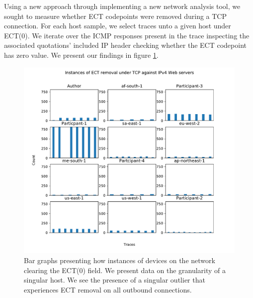 \documentclass{l4proj}
\begin{document}
Using a new approach through implementing a new network analysis tool, we sought to measure whether ECT codepoints were removed during a TCP connection. For each host sample, we select traces unto a given host under ECT(0). We iterate over the ICMP responses present in the trace inspecting the associated quotations' included IP header checking whether the ECT codepoint has zero value. We present our findings in figure \ref{fig:ect_strip}.

\begin{figure}[H]
    \centering
    \includegraphics[scale=0.7]{dissertation/images/tcp_bar.pdf}
    \caption{Bar graphs presenting how instances of devices on the network clearing the ECT(0) field. We present data on the granularity of a singular host. We see the presence of a singular outlier that experiences ECT removal on all outbound connections.}
    \label{fig:ect_strip}
\end{figure}
\end{document}
